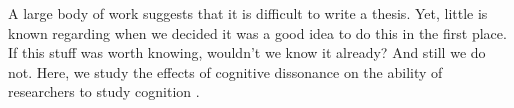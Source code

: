 A large body of work suggests that it is difficult to write a thesis.
Yet, little is known regarding when we decided it was a good idea to do this in the first place.
If this stuff was worth knowing, wouldn't we know it already?
And still we do not.
Here, we study the effects of cognitive dissonance on the ability of researchers to study cognition \citep{Brehm:1962}.
